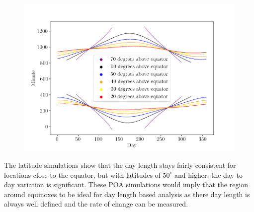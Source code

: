 \begin{figure}[ht!]
\centering
\includegraphics[width=1\linewidth]{pics/poa_var_lat}
\label{fig_poa_var_lat}
\end{figure}

\noindent The latitude simulations show that the day length stays fairly consistent for locations close to the equator, but with latitudes of $50^\circ$ and higher, the day to day variation is significant. These POA simulations would imply that the region around equinoxes to be ideal for day length based analysis as there day length is always well defined and the rate of change can be measured. 








